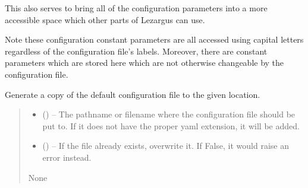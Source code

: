\documentclass[letterpaper,11pt,english]{sphinxmanual}
\begin{document}
\sphinxAtStartPar
This also serves to bring all of the configuration parameters into a more
accessible space which other parts of Lezargus can use.

\sphinxAtStartPar
Note these configuration constant parameters are all accessed using capital
letters regardless of the configuration file’s labels. Moreover, there are
constant parameters which are stored here which are not otherwise changeable
by the configuration file.

\begin{savenotes}\begin{fulllineitems}
\label{\detokenize{code/lezargus.library.config:lezargus.library.config.generate_configuration_file_copy}}
\pysigstartsignatures
{}
\pysigstopsignatures
\sphinxAtStartPar
Generate a copy of the default configuration file to the given location.
\begin{quote}\begin{description}
\begin{itemize}
\item {} 
\sphinxAtStartPar
{} () – The pathname or filename where the configuration file should be put
to. If it does not have the proper yaml extension, it will be added.

\item {} 
\sphinxAtStartPar
{} (\sphinxstyleliteralemphasis{\sphinxupquote{, }}) – If the file already exists, overwrite it. If False, it would raise
an error instead.

\end{itemize}

\sphinxAtStartPar
None

\end{description}\end{quote}

\end{fulllineitems}\end{savenotes}
\end{document}
